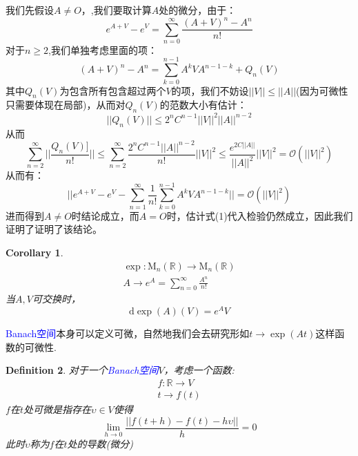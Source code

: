 \documentclass[a4paper,12pt]{ctexart}
\newenvironment{prooff}{{\noindent\it\textcolor{cyan!40!black}{Proof}:}\quad}{\par}
\newtheorem{defn}{Definition}[section]
\newtheorem{coro}[defn]{Corollary}
\newcommand{\bb}[1]{\mathbb{#1}}
\begin{document}
\begin{prooff}
    我们先假设$A\neq O$，,我们要取计算$A$处的微分，由于：\begin{equation*}
        e^{A+V}-e^{V}=\sum_{n=0}^{\infty}\frac{(A+V)^n-A^n}{n!}
    \end{equation*}
    对于$n\ge 2$,我们单独考虑里面的项：
    \begin{equation*}
        (A+V)^n-A^n=\sum_{k=0}^{n-1}A^kVA^{n-1-k}+Q_n(V)
    \end{equation*}
    其中$Q_n(V)$为包含所有包含超过两个$V$的项，我们不妨设$||V||\le ||A||$(因为可微性只需要体现在局部)，从而对$Q_n(V)$的范数大小有估计：
    \begin{equation*}
        ||Q_n(V) ||\le 2^n C^{n-1}||V||^2||A||^{n-2}
    \end{equation*}
    从而\begin{equation*}
        \sum_{n=2}^{\infty} ||\frac{Q_n(V)]}{n!} ||\le \sum_{n=2}^{\infty} \frac{2^n C^{n-1}||A||^{n-2}}{n!}||V||^2
        \le \frac{e^{2C||A||}}{||A||^2}||V||^2=\mathcal{O}(||V||^2)
    \end{equation*}
    从而有：\begin{equation}
        ||e^{A+V}-e^{V}-\sum_{n=1}^{\infty}\frac{1}{n!}\sum_{k=0}^{n-1}A^kVA^{n-1-k}||=\mathcal{O}(||V||^2)
    \end{equation}
    进而得到$A\neq O$时结论成立，而$A=O$时，估计式(1)代入检验仍然成立，因此我们证明了证明了该结论。
\end{prooff}
\begin{coro}
    \begin{align*}
        \exp : \text{M}_n(\mathbb{R})\rightarrow \text{M}_n(\mathbb{R}) \\
        A\rightarrow e^{A}=\sum_{n=0}^{\infty} \frac{A^n}{n!}
    \end{align*}
    当$A,V$可交换时，\begin{equation*}
        \text{d}\exp (A)(V)=e^AV
    \end{equation*}
\end{coro}
\textcolor{blue}{Banach空间}本身可以定义可微，自然地我们会去研究形如$t\rightarrow \exp(At)$这样函数的可微性.
\begin{defn}
    \label{defn:Banach space diff}
    对于一个\textcolor{blue}{Banach空间}$V$，考虑一个函数:
    \begin{align*}
        f:\bb{R}\rightarrow V \\
        t\rightarrow f(t)
    \end{align*}
    $f$在$t$处可微是指存在$\upsilon\in V$使得
    \begin{equation*}
        \lim_{h\to 0}\frac{||f(t+h)-f(t)-h\upsilon||}{h}=0
    \end{equation*}
    此时$\upsilon$称为$f$在$t$处的导数(微分)
\end{defn}
\end{document}

